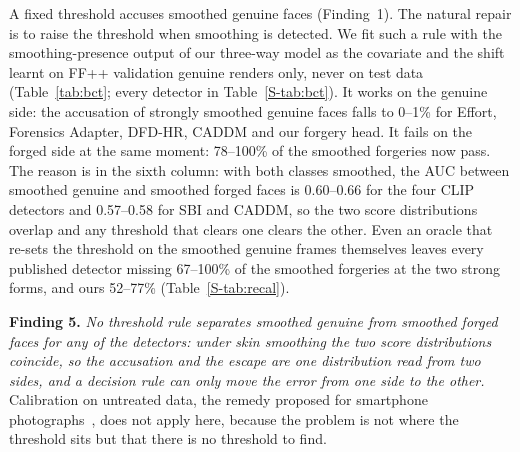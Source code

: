 \documentclass[journal]{IEEEtran}  %
\begin{document}
A fixed threshold accuses smoothed genuine faces (Finding~1). The natural repair is to raise the threshold when smoothing is
detected. We fit such a rule with the smoothing-presence output of our three-way model as the covariate and the shift learnt
on FF++ validation genuine renders only, never on test data (Table~\ref{tab:bct}; every detector in Table~\ref{S-tab:bct}). It works on the genuine side: the
accusation of strongly smoothed genuine faces falls to 0--1\% for Effort, Forensics Adapter, DFD-HR, CADDM and our forgery
head.
It fails on the forged side at the same moment: 78--100\% of the smoothed forgeries now pass.
The reason is in the sixth column: with both classes smoothed, the AUC between smoothed genuine and smoothed forged faces is
0.60--0.66 for the four CLIP detectors and 0.57--0.58 for SBI and CADDM, so the two score distributions overlap and any
threshold that clears one clears the other.
Even an oracle that re-sets the threshold on the smoothed genuine frames themselves leaves every published detector
missing 67--100\% of the smoothed forgeries at the two strong forms, and ours 52--77\% (Table~\ref{S-tab:recal}).

\textbf{Finding 5.} \emph{No threshold rule separates smoothed genuine from smoothed forged faces for any of the
detectors: under skin smoothing the two score distributions coincide, so the accusation and the escape are one distribution
read from two sides, and a decision rule can only move the error from one side to the other.} Calibration on untreated data,
the remedy proposed for smartphone photographs~\cite{laionmobile2026}, does not apply here, because the problem is not where
the threshold sits but that there is no threshold to find.
\end{document}
